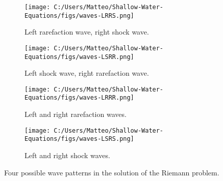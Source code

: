 \begin{figure}[htbp]
    \centering
    \begin{subfigure}[b]{0.4\textwidth}
        \centering
        \texttt{[image: C:/Users/Matteo/Shallow-Water-Equations/figs/waves-LRRS.png]}
        \caption{Left rarefaction wave, right shock wave.}\label{fig:waves-LRRS}
    \end{subfigure}
    \hspace{0.02\textwidth} %
    \begin{subfigure}[b]{0.4\textwidth}
        \centering
        \texttt{[image: C:/Users/Matteo/Shallow-Water-Equations/figs/waves-LSRR.png]}
        \caption{Left shock wave, right rarefaction wave.}\label{fig:waves-LSRR}
    \end{subfigure}
    
    \begin{subfigure}[b]{0.4\textwidth}
        \centering
        \texttt{[image: C:/Users/Matteo/Shallow-Water-Equations/figs/waves-LRRR.png]}
        \caption{Left and right rarefaction waves.}\label{fig:waves-LRRR}
    \end{subfigure}
    \hspace{0.02\textwidth} %
    \begin{subfigure}[b]{0.4\textwidth}
        \centering
        \texttt{[image: C:/Users/Matteo/Shallow-Water-Equations/figs/waves-LSRS.png]}
        \caption{Left and right shock waves.}\label{fig:waves-LSRS}
    \end{subfigure}
    \caption{Four possible wave patterns in the solution of the Riemann problem.}\label{fig:wave-patterns}
\end{figure}

